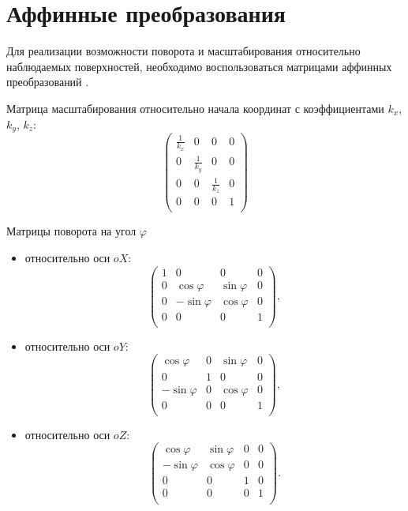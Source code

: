 
\section{Аффинные преобразования}

Для реализации возможности поворота и масштабирования относительно наблюдаемых поверхностей, необходимо воспользоваться матрицами аффинных преобразований \cite{Newman}.

Матрица масштабирования относительно начала координат с коэффициентами $k_x$, $k_y$, $k_z$:
\begin{equation}
	\begin{pmatrix}
		\frac{1}{k_x} & 0 & 0 & 0 \\
		0 & \frac{1}{k_y} & 0 & 0 \\
		0 & 0 & \frac{1}{k_z} & 0 \\
		0 & 0 & 0 & 1 \\
	\end{pmatrix}
\end{equation}

Матрицы поворота на угол $\varphi$
\begin{itemize}
	\item относительно оси $oX$:
		\begin{equation}
			\begin{pmatrix}
			1 & 0 & 0 & 0 \\
			0 & \cos\varphi & \sin\varphi & 0 \\
			0 & -\sin\varphi & \cos\varphi & 0 \\
			0 & 0 & 0 & 1 \\
		\end{pmatrix},
	\end{equation}
	
	\item относительно оси $oY$:
	\begin{equation}
		\begin{pmatrix}
			\cos\varphi & 0 & \sin\varphi & 0 \\
			0 & 1 & 0 & 0 \\
			-\sin\varphi & 0 & \cos\varphi & 0 \\
			0 & 0 & 0 & 1 \\
		\end{pmatrix},
	\end{equation}
	
	\item относительно оси $oZ$:
	\begin{equation}
		\begin{pmatrix}
			\cos\varphi & \sin\varphi & 0 & 0 \\
			-\sin\varphi & \cos\varphi & 0 & 0 \\
			0 & 0 & 1 & 0 \\
			0 & 0 & 0 & 1 \\
		\end{pmatrix}.
	\end{equation}
\end{itemize}

